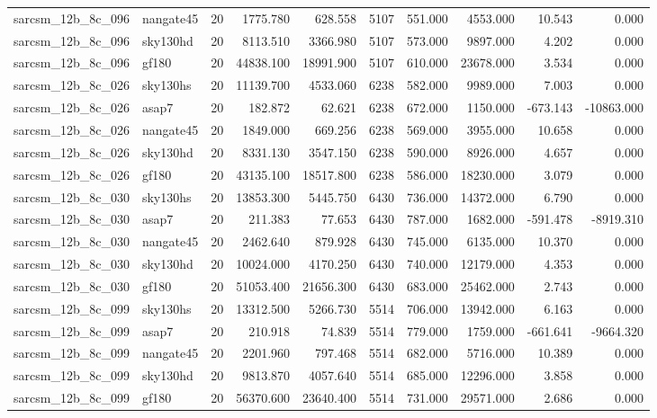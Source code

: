 \documentclass{article}
\begin{document}
\begin{longtable}{llrrrrrrrr}
sarcsm\_12b\_8c\_096 & nangate45 & 20 & 1775.780 & 628.558 & 5107 & 551.000 & 4553.000 & 10.543 & 0.000 \\
sarcsm\_12b\_8c\_096 & sky130hd & 20 & 8113.510 & 3366.980 & 5107 & 573.000 & 9897.000 & 4.202 & 0.000 \\
sarcsm\_12b\_8c\_096 & gf180 & 20 & 44838.100 & 18991.900 & 5107 & 610.000 & 23678.000 & 3.534 & 0.000 \\
sarcsm\_12b\_8c\_026 & sky130hs & 20 & 11139.700 & 4533.060 & 6238 & 582.000 & 9989.000 & 7.003 & 0.000 \\
sarcsm\_12b\_8c\_026 & asap7 & 20 & 182.872 & 62.621 & 6238 & 672.000 & 1150.000 & -673.143 & -10863.000 \\
sarcsm\_12b\_8c\_026 & nangate45 & 20 & 1849.000 & 669.256 & 6238 & 569.000 & 3955.000 & 10.658 & 0.000 \\
sarcsm\_12b\_8c\_026 & sky130hd & 20 & 8331.130 & 3547.150 & 6238 & 590.000 & 8926.000 & 4.657 & 0.000 \\
sarcsm\_12b\_8c\_026 & gf180 & 20 & 43135.100 & 18517.800 & 6238 & 586.000 & 18230.000 & 3.079 & 0.000 \\
sarcsm\_12b\_8c\_030 & sky130hs & 20 & 13853.300 & 5445.750 & 6430 & 736.000 & 14372.000 & 6.790 & 0.000 \\
sarcsm\_12b\_8c\_030 & asap7 & 20 & 211.383 & 77.653 & 6430 & 787.000 & 1682.000 & -591.478 & -8919.310 \\
sarcsm\_12b\_8c\_030 & nangate45 & 20 & 2462.640 & 879.928 & 6430 & 745.000 & 6135.000 & 10.370 & 0.000 \\
sarcsm\_12b\_8c\_030 & sky130hd & 20 & 10024.000 & 4170.250 & 6430 & 740.000 & 12179.000 & 4.353 & 0.000 \\
sarcsm\_12b\_8c\_030 & gf180 & 20 & 51053.400 & 21656.300 & 6430 & 683.000 & 25462.000 & 2.743 & 0.000 \\
sarcsm\_12b\_8c\_099 & sky130hs & 20 & 13312.500 & 5266.730 & 5514 & 706.000 & 13942.000 & 6.163 & 0.000 \\
sarcsm\_12b\_8c\_099 & asap7 & 20 & 210.918 & 74.839 & 5514 & 779.000 & 1759.000 & -661.641 & -9664.320 \\
sarcsm\_12b\_8c\_099 & nangate45 & 20 & 2201.960 & 797.468 & 5514 & 682.000 & 5716.000 & 10.389 & 0.000 \\
sarcsm\_12b\_8c\_099 & sky130hd & 20 & 9813.870 & 4057.640 & 5514 & 685.000 & 12296.000 & 3.858 & 0.000 \\
sarcsm\_12b\_8c\_099 & gf180 & 20 & 56370.600 & 23640.400 & 5514 & 731.000 & 29571.000 & 2.686 & 0.000 \\

\end{longtable}
\end{document}
